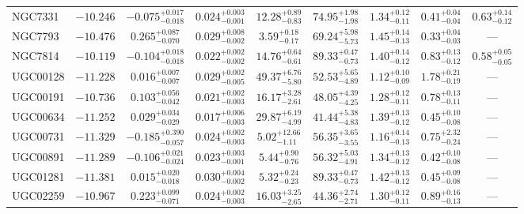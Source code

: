 \documentclass[twocolumn,tighten]{aastex63}
\begin{document}
\begin{table}
\begin{center}
\begin{tabular}{lcccccccc}
    NGC7331 & $ -10.246  $ & $ -0.075 _{ -0.018 } ^{ + 0.017 } $ & $ 0.024 _{ -0.001 } ^{ + 0.003 } $ & $ 12.28 _{ -0.83 } ^{ + 0.89 } $ & $ 74.95 _{ -1.98 } ^{ + 1.98 } $ & $ 1.34 _{ -0.11 } ^{ + 0.12 } $ & $ 0.41 _{ -0.04 } ^{ + 0.04 } $ & $ 0.63 _{ -0.12 } ^{ + 0.14 } $  \\  
    NGC7793 & $ -10.476 $ & $ 0.265 _{ -0.070 } ^{ + 0.087 } $ & $ 0.029 _{ -0.002 } ^{ + 0.008 } $ & $ 3.59 _{ -0.17 } ^{ + 0.18 } $ & $ 69.24 _{ -5.73 } ^{ + 5.98 } $ & $ 1.45 _{ -0.13 } ^{ + 0.14 } $ & $ 0.33 _{ -0.03 } ^{ + 0.04 } $ & --- \\  
    NGC7814 & $ -10.119  $ & $ -0.104 _{ -0.018 } ^{ + 0.018 } $ & $ 0.022 _{ -0.002 } ^{ + 0.002 } $ & $ 14.76 _{ -0.61 } ^{ + 0.64 } $ & $ 89.33 _{ -0.73 } ^{ + 0.47 } $ & $ 1.40 _{ -0.12 } ^{ + 0.14 } $ & $ 0.83 _{ -0.12 } ^{ + 0.13 } $ & $ 0.58 _{ -0.05 } ^{ + 0.05 } $  \\  
   UGC00128 & $ -11.228 $ & $ 0.016 _{ -0.007 } ^{ + 0.007 } $ & $ 0.029 _{ -0.005 } ^{ + 0.002 } $ & $ 49.37 _{ -5.80 } ^{ + 6.76 } $ & $ 52.53 _{ -4.89 } ^{ + 5.65 } $ & $ 1.12 _{ -0.09 } ^{ + 0.10 } $ & $ 1.78 _{ -0.19 } ^{ + 0.21 } $ & --- \\  
   UGC00191 & $ -10.736 $ & $ 0.103 _{ -0.042 } ^{ + 0.056 } $ & $ 0.021 _{ -0.003 } ^{ + 0.002 } $ & $ 16.17 _{ -2.61 } ^{ + 3.28 } $ & $ 48.05 _{ -4.25 } ^{ + 4.39 } $ & $ 1.28 _{ -0.11 } ^{ + 0.12 } $ & $ 0.78 _{ -0.11 } ^{ + 0.13 } $ & --- \\  
   UGC00634 & $ -11.252 $ & $ 0.029 _{ -0.029 } ^{ + 0.034 } $ & $ 0.017 _{ -0.003 } ^{ + 0.006 } $ & $ 29.87 _{ -4.99 } ^{ + 6.19 } $ & $ 41.44 _{ -4.83 } ^{ + 5.38 } $ & $ 1.39 _{ -0.12 } ^{ + 0.13 } $ & $ 0.45 _{ -0.08 } ^{ + 0.10 } $ & --- \\  
   UGC00731 & $ -11.329 $ & $ -0.185 _{ -0.057 } ^{ + 0.390 } $ & $ 0.024 _{ -0.003 } ^{ + 0.002 } $ & $ 5.02 _{ -1.11 } ^{ + 12.66 } $ & $ 56.35 _{ -3.55 } ^{ + 3.65 } $ & $ 1.16 _{ -0.13 } ^{ + 0.14 } $ & $ 0.75 _{ -0.24 } ^{ + 2.32 } $ & --- \\  
   UGC00891 & $ -11.289 $ & $ -0.106 _{ -0.024 } ^{ + 0.021 } $ & $ 0.023 _{ -0.001 } ^{ + 0.003 } $ & $ 5.44 _{ -0.76 } ^{ + 0.90 } $ & $ 56.32 _{ -4.91 } ^{ + 5.03 } $ & $ 1.34 _{ -0.12 } ^{ + 0.13 } $ & $ 0.42 _{ -0.08 } ^{ + 0.10 } $ & --- \\  
   UGC01281 & $ -11.381 $ & $ 0.015 _{ -0.018 } ^{ + 0.020 } $ & $ 0.030 _{ -0.002 } ^{ + 0.004 } $ & $ 5.32 _{ -0.23 } ^{ + 0.24 } $ & $ 89.33 _{ -0.73 } ^{ + 0.47 } $ & $ 1.42 _{ -0.12 } ^{ + 0.13 } $ & $ 0.45 _{ -0.08 } ^{ + 0.09 } $ & --- \\  
   UGC02259 & $ -10.967 $ & $ 0.223 _{ -0.071 } ^{ + 0.099 } $ & $ 0.024 _{ -0.003 } ^{ + 0.002 } $ & $ 16.03 _{ -2.65 } ^{ + 3.25 } $ & $ 44.36 _{ -2.71 } ^{ + 2.74 } $ & $ 1.30 _{ -0.11 } ^{ + 0.12 } $ & $ 0.89 _{ -0.13 } ^{ + 0.16 } $ & --- \\  
 \hline
\end{tabular}
\end{center}
\end{table}
\end{document}
